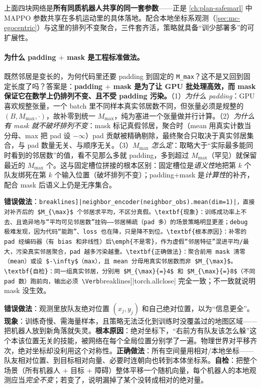 \noindent 上面四块网络是\textbf{所有同质机器人共享的同一套参数}——正是 \cref{ch:plan-safemarl} 中 MAPPO 参数共享在多机运动里的具体落地。配合本地坐标系观测（\cref{sec:mc-egocentric}）与这里的排列不变聚合，三件套齐活，策略就具备“训少部署多”的可扩展性。

\paragraph{为什么 padding $+$ mask 是工程标准做法。}
既然邻居是变长的，为何代码里还要 padding 到固定的 \verb|M_max|？这不是又回到固定长度了吗？答案是：\textbf{padding $+$ mask 是为了让 GPU 批处理高效，而 mask 保证它在数学上仍排列不变、且不受 padding 污染。}（1）\emph{为什么 padding}：GPU 喜欢规整张量，一个 batch 里不同样本真实邻居数不同，但张量必须是规整的 $(B,M_{\max},\cdot)$，故补零到统一 $M_{\max}$，纯为塞进一个张量做并行计算。（2）\emph{为什么有 mask 就不破坏排列不变}：mask 标记真假邻居，聚合时（mean 用真实计数当分母、max 把 pad 设 $-\infty$）pad 贡献被精确剔除，最终聚合只取决于真实邻居集合，与 pad 数量无关、与顺序无关。（3）\emph{$M_{\max}$ 怎么定}：取略大于“实际最多能同时看到的邻居数”的值，看不见那么多就 padding，多到超过 $M_{\max}$（罕见）就保留最近的 $M_{\max}$ 个。这与固定槽位拼接的根本区别：固定槽位是\emph{语义性}地把第 $k$ 个队友绑死在第 $k$ 个输入位置（破坏排列不变）；padding$+$mask 是\emph{计算性}的补齐，配合 mask 后语义上仍是无序集合。

\begin{pitfall}
\textbf{错误做法}：\Verb[breaklines]|neighbor_encoder(neighbor_obs).mean(dim=1)|，直接对补齐后的 $M_{\max}$ 个邻居求平均，不区分真假。\textbf{现象}：训练成功率上不去、且诡异地与“平均可见邻居数”挂钩——邻居稀疏（pad 多）的场景策略明显更差；debug 极难发现，因为代码“能跑”、loss 也在降，只是降不到位。\textbf{根本原因}：补零的 pad 经编码器（有 bias 和非线性）后\emph{不是零}，作为虚假“邻居特征”混进平均/最大，污染真实邻居聚合，pad 越多污染越重。\textbf{正确做法}：聚合前用 mask 清零（mean）或设 $-\infty$（max），且 mean 分母用真实邻居数而非 $M_{\max}$。\textbf{自检}：同一组真实邻居，分别用 $M_{\max}{=}4$ 和 $M_{\max}{=}8$（不同 pad 数）跑前向，输出必须 \Verb[breaklines]|torch.allclose| 完全一致；不一致就说明 mask 没生效。
\end{pitfall}

\begin{pitfall}
\textbf{错误做法}：观测里放队友绝对位置 $(x_j,y_j)$ 和自己绝对位置，以为“信息更全”。\textbf{现象}：训练奇慢、需海量样本，且策略无法泛化到训练时没覆盖过的地图区域——把机器人放到新角落就失灵。\textbf{根本原因}：绝对坐标下，“右前方有队友该怎么躲”这个本该位置无关的技能，被网络在每个全局位置分别学了一遍。物理世界对平移齐次，绝对坐标却没利用这个对称性。\textbf{正确做法}：所有空间量用相对/本地坐标——队友相对位置、到目标相对向量、必要时连朝向也转到本体坐标系。\textbf{自检}：把整个场景（所有机器人 $+$ 目标 $+$ 障碍）整体平移一个随机向量，每个机器人的本地观测应当\emph{完全不变}；若变了，说明漏掉了某个没转成相对的绝对量。
\end{pitfall}

